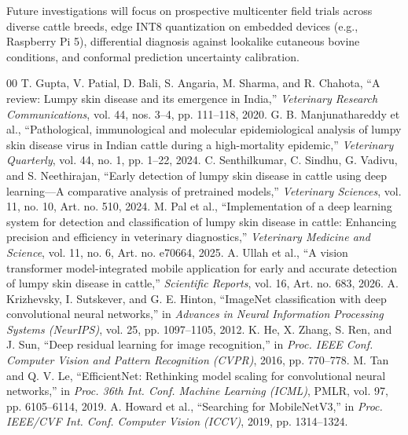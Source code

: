 \documentclass[conference]{IEEEtran}
\begin{document}
Future investigations will focus on prospective multicenter field trials across diverse cattle breeds, edge INT8 quantization on embedded devices (e.g., Raspberry Pi 5), differential diagnosis against lookalike cutaneous bovine conditions, and conformal prediction uncertainty calibration.


\begin{thebibliography}{00}
 T. Gupta, V. Patial, D. Bali, S. Angaria, M. Sharma, and R. Chahota, ``A review: Lumpy skin disease and its emergence in India,'' \textit{Veterinary Research Communications}, vol. 44, nos. 3--4, pp. 111--118, 2020.
 G. B. Manjunathareddy et al., ``Pathological, immunological and molecular epidemiological analysis of lumpy skin disease virus in Indian cattle during a high-mortality epidemic,'' \textit{Veterinary Quarterly}, vol. 44, no. 1, pp. 1--22, 2024.
 C. Senthilkumar, C. Sindhu, G. Vadivu, and S. Neethirajan, ``Early detection of lumpy skin disease in cattle using deep learning---A comparative analysis of pretrained models,'' \textit{Veterinary Sciences}, vol. 11, no. 10, Art. no. 510, 2024.
 M. Pal et al., ``Implementation of a deep learning system for detection and classification of lumpy skin disease in cattle: Enhancing precision and efficiency in veterinary diagnostics,'' \textit{Veterinary Medicine and Science}, vol. 11, no. 6, Art. no. e70664, 2025.
 A. Ullah et al., ``A vision transformer model-integrated mobile application for early and accurate detection of lumpy skin disease in cattle,'' \textit{Scientific Reports}, vol. 16, Art. no. 683, 2026.
 A. Krizhevsky, I. Sutskever, and G. E. Hinton, ``ImageNet classification with deep convolutional neural networks,'' in \textit{Advances in Neural Information Processing Systems (NeurIPS)}, vol. 25, pp. 1097--1105, 2012.
 K. He, X. Zhang, S. Ren, and J. Sun, ``Deep residual learning for image recognition,'' in \textit{Proc. IEEE Conf. Computer Vision and Pattern Recognition (CVPR)}, 2016, pp. 770--778.
 M. Tan and Q. V. Le, ``EfficientNet: Rethinking model scaling for convolutional neural networks,'' in \textit{Proc. 36th Int. Conf. Machine Learning (ICML)}, PMLR, vol. 97, pp. 6105--6114, 2019.
 A. Howard et al., ``Searching for MobileNetV3,'' in \textit{Proc. IEEE/CVF Int. Conf. Computer Vision (ICCV)}, 2019, pp. 1314--1324.

\end{thebibliography}
\end{document}
